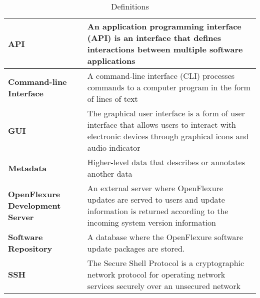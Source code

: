 \begin{table}[H]
     \centering
     \begin{tabular}{|l|p{5cm}|}
         \hline
         \textbf{API} &
         An application programming interface (API) is an interface that defines interactions between multiple software applications \\
         \hline
         \textbf{Command-line Interface} &
		 A command-line interface (CLI) processes commands to a computer program in the form of lines of text \\
		  \hline
         \textbf{GUI} &
		  The graphical user interface is a form of user interface that allows users to interact with electronic devices through graphical icons and audio indicator \\
		  \hline
          \textbf{Metadata} & Higher-level data that describes or annotates another data \\
          \hline
          \textbf{OpenFlexure Development Server} & An external server where OpenFlexure updates are served to users and update information is returned according to the incoming system version information \\
         \hline
          \textbf{Software Repository} & A database where the OpenFlexure software update packages are stored. \\
     	\hline
          \textbf{SSH} & The Secure Shell Protocol is a cryptographic network protocol for operating network services securely over an unsecured network \\
		\hline
     \end{tabular}
     \caption{Definitions}
     \label{tab:definitions}
 \end{table}